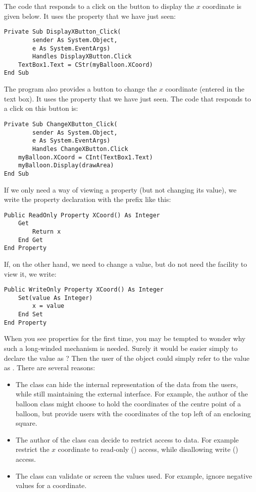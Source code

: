 		The code that responds to a click on the button to display the $x$ coordinate is given below. It uses the  property that we have just seen:
		\begin{lstlisting}
Private Sub DisplayXButton_Click(
		sender As System.Object,
		e As System.EventArgs)
		Handles DisplayXButton.Click
	TextBox1.Text = CStr(myBalloon.XCoord)
End Sub
		\end{lstlisting}
		The program also provides a button to change the $x$ coordinate (entered in the text box). It uses the  property that we have just seen. The code that responds to a click on this button is:
		\begin{lstlisting}
Private Sub ChangeXButton_Click(
		sender As System.Object,
		e As System.EventArgs)
		Handles ChangeXButton.Click
	myBalloon.XCoord = CInt(TextBox1.Text)
	myBalloon.Display(drawArea)
End Sub
		\end{lstlisting}
		If we only need a way of viewing a property (but not changing its value), we write the property declaration with the prefix  like this:
		\begin{lstlisting}
Public ReadOnly Property XCoord() As Integer
	Get
		Return x
	End Get
End Property
		\end{lstlisting}
		If, on the other hand, we need to change a value, but do not need the facility to view it, we write:
		\begin{lstlisting}
Public WriteOnly Property XCoord() As Integer
	Set(value As Integer)
		x = value
	End Set
End Property
		\end{lstlisting}
		When you see properties for the first time, you may be tempted to wonder why such a long-winded mechanism is needed. Surely it would be easier simply to declare the value  as ? Then the user of the object could simply refer to the value as . There are several reasons:
		\begin{itemize}
      \item The class can hide the internal representation of the data from the users, while still maintaining the external interface. For example, the author of the balloon class might choose to hold the coordinates of the centre point of a balloon, but provide users with the coordinates of the top left of an enclosing square.
			\item The author of the class can decide to restrict access to data. For example restrict the $x$ coordinate to read-only () access, while disallowing write () access.
      \item The class can validate or screen the values used. For example, ignore negative values for a coordinate.
		\end{itemize}

